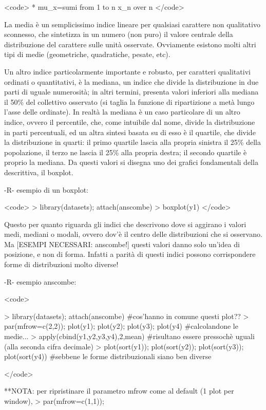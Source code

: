 \documentclass{book}
\begin{document}
<code>
 *	mu_x=sum{i from 1 to n} x_n over n
</code>

La media è un semplicissimo indice lineare per qualsiasi carattere non qualitativo sconnesso, che sintetizza in un numero (non puro) il valore centrale della distribuzione del carattere sulle unità osservate. Ovviamente esistono molti altri tipi di medie (geometriche, quadratiche, pesate, etc).

Un altro indice particolarmente importante e robusto, per caratteri qualitativi ordinati o quantitativi, è la mediana, un indice che divide la distribuzione in due parti di uguale numerosità; in altri termini, presenta valori inferiori alla mediana il 50\% del collettivo osservato (si taglia la funzione di ripartizione a metà lungo l'asse delle ordinate).
In realtà la mediana è un caso particolare di un altro indice, ovvero il percentile, che, come intuibile dal nome, divide la distribuzione in parti percentuali, ed un altra sintesi basata su di esso è il quartile, che divide la distribuzione in quarti: il primo quartile lascia alla propria sinistra il 25\% della popolazione, il terzo ne lascia il 25\% alla propria destra; il secondo quartile è proprio la mediana.
Da questi valori si disegna uno dei grafici fondamentali della descrittiva, il boxplot.

	-R-
esempio di un boxplot:

<code>
> library(datasets); attach(anscombe)
> boxplot(y1)
</code>

Questo per quanto riguarda gli indici che descrivono dove si aggirano i valori medi, mediani o modali, ovvero dov'è il centro delle distribuzioni che si osservano. Ma [ESEMPI NECESSARI: anscombe!] questi valori danno solo un'idea di posizione, e non di forma. Infatti a parità di questi indici possono corrispondere forme di distribuzioni molto diverse!

	-R-
esempio anscombe:

<code>

> library(datasets); attach(anscombe)
#cos'hanno in comune questi plot??
> par(mfrow=c(2,2)); plot(y1); plot(y2); plot(y3); plot(y4)
#calcolandone le medie...
> apply(cbind(y1,y2,y3,y4),2,mean)
#risultano essere pressochè uguali (alla seconda cifra decimale)
> plot(sort(y1)); plot(sort(y2)); plot(sort(y3)); plot(sort(y4))
#sebbene le forme distribuzionali siano ben diverse

</code>

**NOTA: per ripristinare il parametro mfrow come al default (1 plot per window), > par(mfrow=c(1,1));
\end{document}
